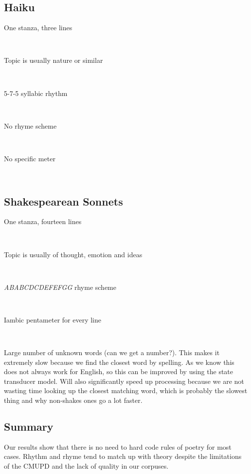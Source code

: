\subsection{Haiku}

\begin{description}
\item[One stanza, three lines]  \hfill \\
\item[Topic is usually nature or similar]  \hfill \\
\item[5-7-5 syllabic rhythm]  \hfill \\
\item[No rhyme scheme]  \hfill \\
\item[No specific meter]  \hfill \\
\end{description}

\subsection{Shakespearean Sonnets}

\begin{description}
\item[One stanza, fourteen lines]  \hfill \\
\item[Topic is usually of thought, emotion and ideas]  \hfill \\
\item[\textit{ABABCDCDEFEFGG} rhyme scheme]  \hfill \\
\item[Iambic pentameter for every line]  \hfill \\
\end{description}

Large number of unknown words (can we get a number?). This makes it extremely slow because we find the closest word by spelling. As we know this does not always work for English, so this can be improved by using the state transducer model. Will also significantly speed up processing because we are not wasting time looking up the closest matching word, which is probably the slowest thing and why non-shakes ones go a lot faster.


\subsection{Summary}
Our results show that there is no need to hard code rules of poetry for most cases. Rhythm and rhyme tend to match up with theory despite the limitations of the CMUPD and the lack of quality in our corpuses.

